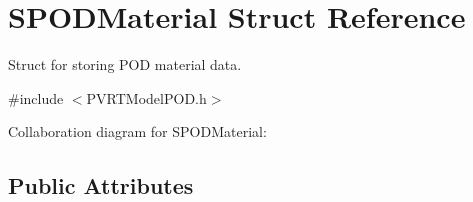 \hypertarget{struct_s_p_o_d_material}{\section{S\+P\+O\+D\+Material Struct Reference}
\label{struct_s_p_o_d_material}
}


Struct for storing P\+O\+D material data.  




{\ttfamily \#include $<$P\+V\+R\+T\+Model\+P\+O\+D.\+h$>$}



Collaboration diagram for S\+P\+O\+D\+Material\+:
\subsection*{Public Attributes}
